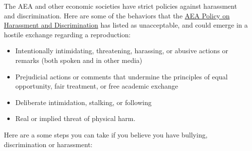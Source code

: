 \documentclass[]{book}
\providecommand{\tightlist}{%
  \setlength{\itemsep}{0pt}\setlength{\parskip}{0pt}}
\begin{document}
The AEA and other economic societies have strict policies against harassment and discrimination. Here are some of the behaviors that the \href{https://www.aeaweb.org/about-aea/aea-policy-harassment-discrimination}{AEA Policy on Harassment and Discrimination} has listed as unacceptable, and could emerge in a hostile exchange regarding a reproduction:

\begin{itemize}
\tightlist
\item
  Intentionally intimidating, threatening, harassing, or abusive actions or remarks (both spoken and in other media)
\item
  Prejudicial actions or comments that undermine the principles of equal opportunity, fair treatment, or free academic exchange
\item
  Deliberate intimidation, stalking, or following
\item
  Real or implied threat of physical harm.
\end{itemize}

Here are a some steps you can take if you believe you have bullying, discrimination or harassment:
\end{document}
